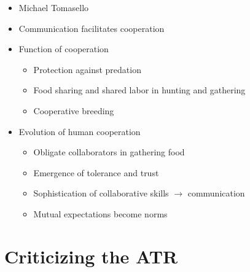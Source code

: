 \documentclass[xcolor=table]{beamer}       %
\begin{document}
\begin{frame}{\insertsection}
    \begin{itemize}
        \item Michael Tomasello
        \item Communication facilitates cooperation
        \item Function of cooperation
            \begin{itemize}
                \item Protection against predation
                \item Food sharing and shared labor in hunting and gathering
                \item Cooperative breeding
            \end{itemize}
        \item Evolution of human cooperation
            \begin{itemize}
                \item Obligate collaborators in gathering food
                \item Emergence of tolerance and trust
                \item Sophistication of collaborative skills $\to$ communication
                \item Mutual expectations become norms
            \end{itemize}
    \end{itemize}
\end{frame}

\section{Criticizing the ATR}
\end{document}

